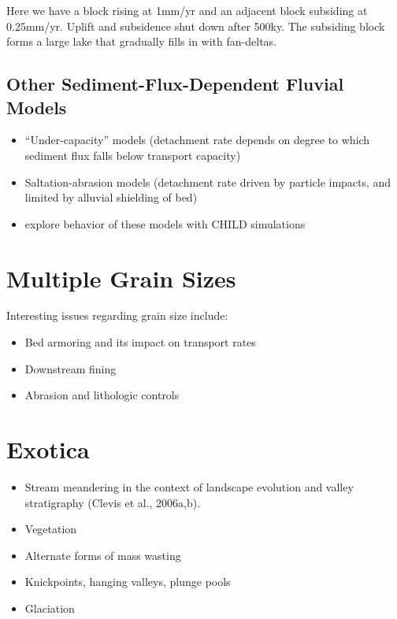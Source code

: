 \documentclass[12pt]{amsart}
\begin{document}
\noindent
Here we have a block rising at 1mm/yr and an adjacent block subsiding at 0.25mm/yr. Uplift and subsidence shut down after 500ky. The subsiding block forms a large lake that gradually fills in with fan-deltas.

\subsection{Other Sediment-Flux-Dependent Fluvial Models}

\begin{itemize}
\item ``Under-capacity'' models (detachment rate depends on degree to which sediment flux falls below transport capacity)
\item Saltation-abrasion models (detachment rate driven by particle impacts, and limited by alluvial shielding of bed)
\item \citet{gasparini2007predictions} explore behavior of these models with CHILD simulations
\end{itemize}

\section{Multiple Grain Sizes}

Interesting issues regarding grain size include:
\begin{itemize}
\item Bed armoring and its impact on transport rates
\item Downstream fining
\item Abrasion and lithologic controls
\end{itemize}

\section{Exotica}

\begin{itemize}
\item Stream meandering in the context of landscape evolution and valley stratigraphy (Clevis et al., 2006a,b).\nocite{clevis2006geoarchaeological}\nocite{clevis2006simple}
\item Vegetation \citep{collins2004modeling,istanbulluoglu2005vegetation}
\item Alternate forms of mass wasting \citep{densmore1998landsliding,lancaster2003effects,istanbulluoglu2005implications}
\item Knickpoints, hanging valleys, plunge pools \citep{flores2006development,crosby2007formation}
\item Glaciation \citep{herman2006fluvial,herman2007tectonomorphic,herman2008evolution}
\end{itemize}
\end{document}
